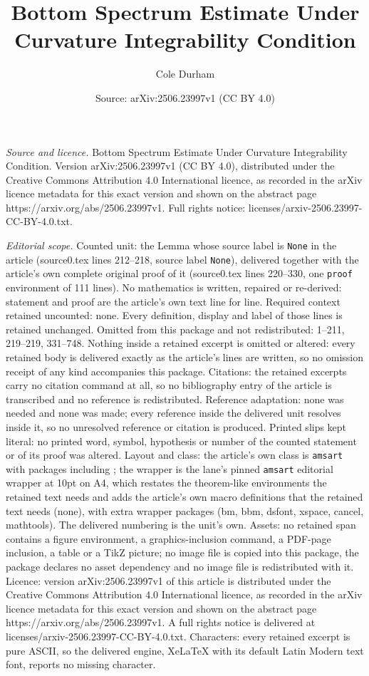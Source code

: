\documentclass[10pt,a4paper]{amsart}
\title[Bottom Spectrum Estimate Under Curvature Integrability Condi]{Bottom Spectrum Estimate Under Curvature Integrability Condition}
\author{Cole Durham}
\date{Source: arXiv:2506.23997v1 (CC BY 4.0)}
\begin{document}
\maketitle

\noindent\emph{Source and licence.} Bottom Spectrum Estimate Under Curvature Integrability Condition. Version arXiv:2506.23997v1 (CC BY 4.0), distributed under the Creative Commons Attribution 4.0 International licence, as recorded in the arXiv licence metadata for this exact version and shown on the abstract page https://arxiv.org/abs/2506.23997v1. Full rights notice: licenses/arxiv-2506.23997-CC-BY-4.0.txt.\par\smallskip

\noindent\textit{Editorial scope.} Counted unit: the Lemma whose source label is \texttt{None} in the article (source0.tex lines 212--218, source label \texttt{None}), delivered together with the article's own complete original proof of it (source0.tex lines 220--330, one \texttt{proof} environment of 111 lines). No mathematics is written, repaired or re-derived: statement and proof are the article's own text line for line. Required context retained uncounted: none. Every definition, display and label of those lines is retained unchanged. Omitted from this package and not redistributed: 1--211, 219--219, 331--748. Nothing inside a retained excerpt is omitted or altered: every retained body is delivered exactly as the article's lines are written, so no omission receipt of any kind accompanies this package. Citations: the retained excerpts carry no citation command at all, so no bibliography entry of the article is transcribed and no reference is redistributed. Reference adaptation: none was needed and none was made; every reference inside the delivered unit resolves inside it, so no unresolved reference or citation is produced. Printed slips kept literal: no printed word, symbol, hypothesis or number of the counted statement or of its proof was altered. Layout and class: the article's own class is \texttt{amsart} with packages including ; the wrapper is the lane's pinned \texttt{amsart} editorial wrapper at 10pt on A4, which restates the theorem-like environments the retained text needs and adds the article's own macro definitions that the retained text needs (none), with extra wrapper packages (bm, bbm, dsfont, xspace, cancel, mathtools). The delivered numbering is the unit's own. Assets: no retained span contains a figure environment, a graphics-inclusion command, a PDF-page inclusion, a table or a TikZ picture; no image file is copied into this package, the package declares no asset dependency and no image file is redistributed with it. Licence: version arXiv:2506.23997v1 of this article is distributed under the Creative Commons Attribution 4.0 International licence, as recorded in the arXiv licence metadata for this exact version and shown on the abstract page https://arxiv.org/abs/2506.23997v1. A full rights notice is delivered at licenses/arxiv-2506.23997-CC-BY-4.0.txt. Characters: every retained excerpt is pure ASCII, so the delivered engine, XeLaTeX with its default Latin Modern text font, reports no missing character.
\end{document}
